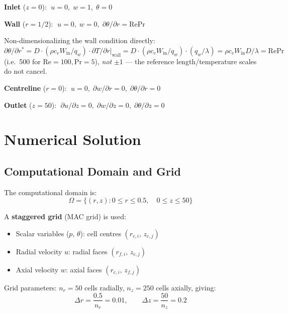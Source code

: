 \documentclass[12pt,a4paper]{article}
\newcommand{\Rey}{\text{Re}}
\newcommand{\Pran}{\text{Pr}}
\begin{document}
\textbf{Inlet} ($z = 0$):
$\;u = 0,\; w = 1,\; \theta = 0$

\textbf{Wall} ($r = 1/2$):
$\;u = 0,\; w = 0,\; \partial\theta/\partial r = \Rey\Pran$

Non-dimensionalizing the wall condition directly: $\partial\theta/\partial r^* = D\cdot(\rho c_v W_{\text{in}}/q_w)\cdot\partial T/\partial r|_{\text{wall}} = D\cdot(\rho c_v W_{\text{in}}/q_w)\cdot(q_w/\lambda) = \rho c_v W_{\text{in}} D/\lambda = \Rey\Pran$ (i.e.\ 500 for $\Rey=100,\Pran=5$), \emph{not} $\pm 1$ — the reference length/temperature scales do not cancel.

\textbf{Centreline} ($r = 0$):
$\;u = 0,\; \partial w/\partial r = 0,\; \partial\theta/\partial r = 0$

\textbf{Outlet} ($z = 50$):
$\;\partial u/\partial z = 0,\; \partial w/\partial z = 0,\; \partial\theta/\partial z = 0$

\newpage

\section{Numerical Solution}

\subsection{Computational Domain and Grid}

The computational domain is:
\begin{equation}
    \Omega = \{(r, z) : 0 \leq r \leq 0.5, \quad 0 \leq z \leq 50\}
\end{equation}

A \textbf{staggered grid} (MAC grid) is used:
\begin{itemize}
    \item Scalar variables ($p$, $\theta$): cell centres $(r_{c,i},\, z_{c,j})$
    \item Radial velocity $u$: radial faces $(r_{f,i},\, z_{c,j})$
    \item Axial velocity $w$: axial faces $(r_{c,i},\, z_{f,j})$
\end{itemize}

Grid parameters: $n_r = 50$ cells radially, $n_z = 250$ cells axially, giving:
\begin{equation}
    \Delta r = \frac{0.5}{n_r} = 0.01, \qquad \Delta z = \frac{50}{n_z} = 0.2
\end{equation}
\end{document}
